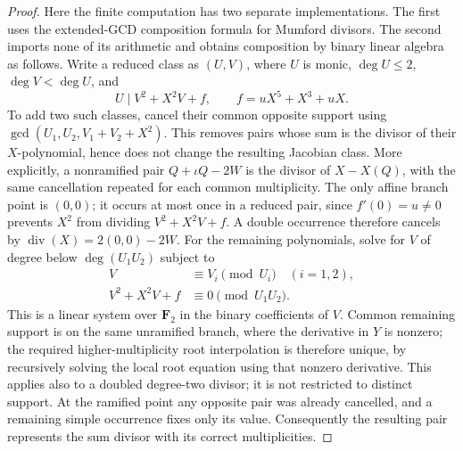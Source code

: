 \documentclass[11pt,a4paper]{article}
\begin{document}
\begin{proof}
Here the finite computation has two separate implementations.
The first uses the extended-GCD composition formula for Mumford
divisors.  The second imports none of its arithmetic and obtains
composition by binary linear algebra as follows.  Write a reduced
class as $(U,V)$, where $U$ is monic, $\deg U\le2$,
$\deg V<\deg U$, and
\[
                         U\mid V^2+X^2V+f,
                \qquad f=uX^5+X^3+uX.
 \tag{OR.10}
\]
To add two such classes, cancel their common opposite support
using $\gcd(U_1,U_2,V_1+V_2+X^2)$.  This removes pairs whose
sum is the divisor of their $X$-polynomial, hence does not change
the resulting Jacobian class.  More explicitly, a nonramified
pair $Q+\iota Q-2W$ is the divisor of $X-X(Q)$, with the
same cancellation repeated for each common multiplicity.  The
only affine branch point is $(0,0)$; it occurs at most once in
a reduced pair, since $f'(0)=u\ne0$ prevents $X^2$ from
dividing $V^2+X^2V+f$.  A double occurrence therefore cancels
by $\operatorname{div}(X)=2(0,0)-2W$.
For the remaining polynomials,
solve for $V$ of degree below $\deg(U_1U_2)$ subject to
\[
 \begin{aligned}
 V&\equiv V_i\pmod{U_i}\quad(i=1,2),\\
 V^2+X^2V+f&\equiv0\pmod{U_1U_2}.
 \end{aligned}
 \tag{OR.11}
\]
This is a linear system over $\mathbf F_2$ in the binary
coefficients of $V$.  Common remaining support is on the same
unramified branch, where the derivative in $Y$ is nonzero;
the required higher-multiplicity root interpolation is therefore
unique, by recursively solving the local root equation using
that nonzero derivative.  This applies also to a doubled
degree-two divisor; it is not restricted to distinct support.
At the ramified point any opposite pair was already cancelled,
and a remaining simple occurrence fixes only its value.
Consequently the resulting pair represents the sum divisor
with its correct multiplicities.


\end{proof}
\end{document}
